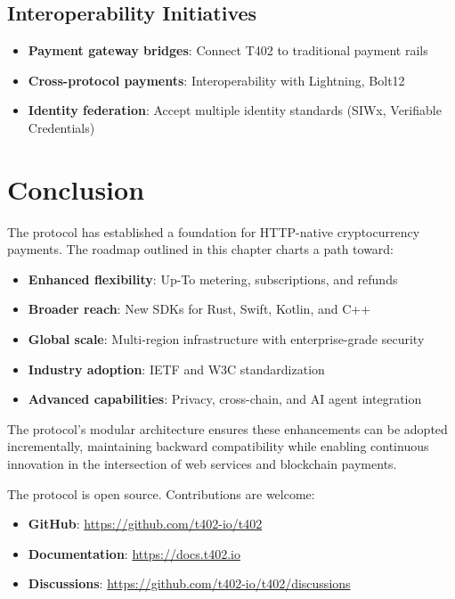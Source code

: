 \subsection{Interoperability Initiatives}

\begin{itemize}
    \item \textbf{Payment gateway bridges}: Connect T402 to traditional payment rails
    \item \textbf{Cross-protocol payments}: Interoperability with Lightning, Bolt12
    \item \textbf{Identity federation}: Accept multiple identity standards (SIWx, Verifiable Credentials)
\end{itemize}

\section{Conclusion}
\label{sec:future-conclusion}

The \tprotocol{} protocol has established a foundation for HTTP-native cryptocurrency payments. The roadmap outlined in this chapter charts a path toward:

\begin{itemize}
    \item \textbf{Enhanced flexibility}: Up-To metering, subscriptions, and refunds
    \item \textbf{Broader reach}: New SDKs for Rust, Swift, Kotlin, and C++
    \item \textbf{Global scale}: Multi-region infrastructure with enterprise-grade security
    \item \textbf{Industry adoption}: IETF and W3C standardization
    \item \textbf{Advanced capabilities}: Privacy, cross-chain, and AI agent integration
\end{itemize}

The protocol's modular architecture ensures these enhancements can be adopted incrementally, maintaining backward compatibility while enabling continuous innovation in the intersection of web services and blockchain payments.

\begin{infobox}[Contributing to T402]
The \tprotocol{} protocol is open source. Contributions are welcome:
\begin{itemize}
    \item \textbf{GitHub}: \url{https://github.com/t402-io/t402}
    \item \textbf{Documentation}: \url{https://docs.t402.io}
    \item \textbf{Discussions}: \url{https://github.com/t402-io/t402/discussions}
\end{itemize}
\end{infobox}
